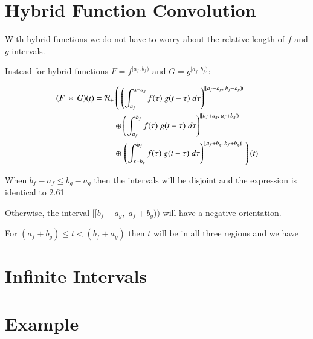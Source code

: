 \section{Hybrid Function Convolution}

With hybrid functions we do not have to worry about the relative length of $f$ and $g$ intervals.

Instead for hybrid functions $F = f^{[a_f, b_f)}$ and $G = g^{[a_f, b_f)}$:

\begin{align}
	(F \;*\; G) (t) = 
		\mathcal{R}_+ &\left( \; \left( 
			\int_{a_f}^{x-a_g} f(\tau) \; g(t-\tau) \; d\tau \right)^{[\![a_f+a_g,\; b_f+a_g)\!)} 
				\right. \notag \\ &\oplus \left( 
			\int_{a_f}^{b_f} f(\tau) \; g(t-\tau) \; d\tau \right)^{[\![b_f+a_g,\; a_f+b_g)\!)} 
				\notag \\ &\oplus \left. \left( 
			\int_{x-b_g}^{b_f} f(\tau) \; g(t-\tau) \; d\tau \right)^{[\![a_f+b_g,\; b_f+b_g)\!)} 
				\; \right)(t)
\end{align}

When $b_f - a_f \leq b_g - a_g$ then the intervals will be disjoint and the expression is identical to 2.61

Otherwise, the interval $[\![b_f +a_g, \; a_f + b_g)\!)$ will have a negative orientation.

For $(a_f+b_g) \leq t < (b_f+a_g)$ then $t$ will be in all three regions and we have


%
%
\section{Infinite Intervals}\label{sec:ConvInfty}



%
%
\section{Example}

\newpage